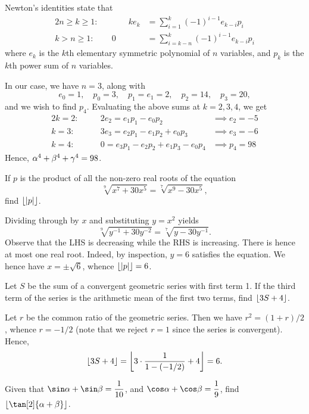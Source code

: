 Newton's identities state that
\begin{alignat*}{2}
    n \geq k \geq 1 :&& \qquad ke_k &= \sum_{i=1}^k (-1)^{i-1} e_{k-i} p_i\\
    k > n \geq 1 :&& 0 &= \sum_{i=k-n}^k (-1)^{i-1} e_{k-i} p_i
\end{alignat*}
where $e_k$ is the $k$th elementary symmetric polynomial of $n$ variables, and $p_k$ is the $k$th power sum of $n$ variables.

In our case, we have $n=3$, along with \[e_0 = 1, \quad p_0 = 3, \quad p_1 = e_1 = 2, \quad p_2 = 14, \quad p_3 = 20,\] and we wish to find $p_4$. Evaluating the above sums at $k = 2, 3, 4$, we get
\begin{alignat*}{2}
    k = 2 : && \quad2e_2 = e_1p_1 - e_0p_2 &\implies e_2 = -5\\
    k = 3 : && \quad 3e_3 = e_2p_1 - e_1p_2 + e_0p_3 &\implies e_3 = -6\\
    k = 4 : && \quad 0 = e_3p_1 - e_2p_2 + e_1p_3 - e_0p_4 &\implies p_4 = 98
\end{alignat*}
Hence, $\alpha^4 + \beta^4 + \gamma^4 = 98$.

\begin{question}[6]\label{A::2021-O-1-10}
    If $p$ is the product of all the non-zero real roots of the equation \[\sqrt[9]{x^7 + 30x^5} = \sqrt[7]{x^9 - 30x^5},\] find $\left\lfloor \left\lvert p \right\rvert \right\rfloor$.
\end{question}

Dividing through by $x$ and substituting $y = x^2$ yields \[\sqrt[9]{y^{-1} + 30y^{-2}} = \sqrt[7]{y - 30y^{-1}}.\] Observe that the LHS is decreasing while the RHS is increasing. There is hence at most one real root. Indeed, by inspection, $y = 6$ satisfies the equation. We hence have $x = \pm \sqrt 6$, whence $\left\lfloor \left\lvert p \right\rvert \right\rfloor = 6$.

\begin{question}[6]\label{A::2021-O-1-11}
    Let $S$ be the sum of a convergent geometric series with first term 1. If the third term of the series is the arithmetic mean of the first two terms, find $\left\lfloor 3S + 4 \right\rfloor$.
\end{question}

Let $r$ be the common ratio of the geometric series. Then we have $r^2 = (1+r)/2$, whence $r = -1/2$ (note that we reject $r = 1$ since the series is convergent). Hence, \[\left\lfloor 3S + 4 \right\rfloor = \left\lfloor 3 \cdot \frac{1}{1 - (-1/2)} + 4 \right\rfloor = 6.\]

\begin{question}[89]\label{A::2021-O-1-12}
    Given that $\sin \a + \sin \b = \dfrac1{10}$, and $\cos \a + \cos \b = \dfrac19$, find $\floor{\tan[2]{\a + \b}}$.
\end{question}

